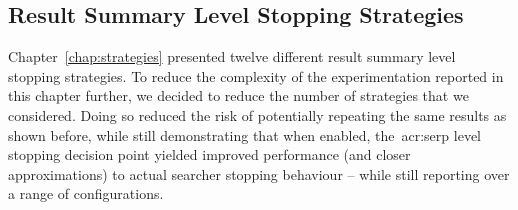 

\subsection{Result Summary Level Stopping Strategies}\label{sec:serp:method:snippet}
Chapter~\ref{chap:strategies} presented twelve different result summary level stopping strategies. To reduce the complexity of the experimentation reported in this chapter further, we decided to reduce the number of strategies that we considered. Doing so reduced the risk of potentially repeating the same results as shown before, while still demonstrating that when enabled, the~\gls{acr:serp} level stopping decision point yielded improved performance (and closer approximations) to actual searcher stopping behaviour -- while still reporting over a range of configurations.

